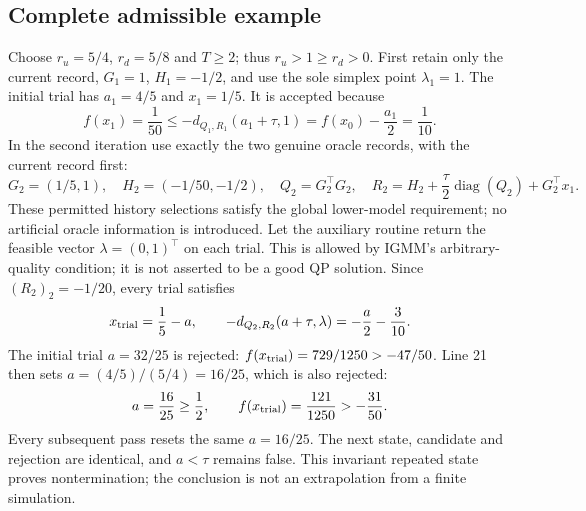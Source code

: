 \documentclass[10pt]{article}
\begin{document}
\subsection*{Complete admissible example}
Choose \(r_u=5/4\), \(r_d=5/8\) and \(T\ge2\); thus \(r_u>1\ge r_d>0\). First retain only the current record, \(G_1=1\), \(H_1=-1/2\), and use the sole simplex point \(\lambda_1=1\). The initial trial has \(a_1=4/5\) and \(x_1=1/5\). It is accepted because \[f(x_1)=\frac1{50}\le
 -d_{Q_1,R_1}(a_1+\tau,1)
 = f(x_0)-\frac{a_1}{2}=\frac1{10}.\] In the second iteration use exactly the two genuine oracle records, with the current record first: \[G_2=(1/5,1),\quad H_2=(-1/50,-1/2),\quad
 Q_2=G_2^\top G_2,\quad
 R_2=H_2+\frac{\tau}{2}\operatorname{diag}(Q_2)+G_2^\top x_1.\] These permitted history selections satisfy the global lower-model requirement; no artificial oracle information is introduced. Let the auxiliary routine return the feasible vector \(\lambda=(0,1)^\top\) on each trial. This is allowed by IGMM’s arbitrary-quality condition; it is not asserted to be a good QP solution. Since \((R_2)_2=-1/20\), every trial satisfies \[x_{\rm trial}=\frac15-a,\qquad
 -d_{Q_2,R_2}(a+\tau,\lambda)=-\frac a2-\frac3{10}.\] The initial trial \(a=32/25\) is rejected: \(f(x_{\rm trial})=729/1250>-47/50\). Line 21 then sets \(a=(4/5)/(5/4)=16/25\), which is also rejected: \[a=\frac{16}{25}\ge\frac12,\qquad
 f(x_{\rm trial})=\frac{121}{1250}>-\frac{31}{50}.\] Every subsequent pass resets the same \(a=16/25\). The next state, candidate and rejection are identical, and \(a<\tau\) remains false. This invariant repeated state proves nontermination; the conclusion is not an extrapolation from a finite simulation.\par
\end{document}
